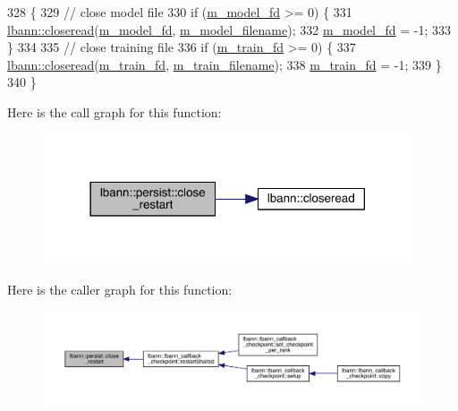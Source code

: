 \begin{DoxyCode}
328                                  \{
329   \textcolor{comment}{// close model file}
330   \textcolor{keywordflow}{if} (\hyperlink{classlbann_1_1persist_a1adc7102c1b4bc91534ca156decbd965}{m\_model\_fd} >= 0) \{
331     \hyperlink{namespacelbann_a38dd30b2ae8214f6595708264369ddb8}{lbann::closeread}(\hyperlink{classlbann_1_1persist_a1adc7102c1b4bc91534ca156decbd965}{m\_model\_fd}, \hyperlink{classlbann_1_1persist_ac01cd3c8fe0f97c1312ca1a595f2f690}{m\_model\_filename});
332     \hyperlink{classlbann_1_1persist_a1adc7102c1b4bc91534ca156decbd965}{m\_model\_fd} = -1;
333   \}
334 
335   \textcolor{comment}{// close training file}
336   \textcolor{keywordflow}{if} (\hyperlink{classlbann_1_1persist_a817671390811dde04670c47139402f51}{m\_train\_fd} >= 0) \{
337     \hyperlink{namespacelbann_a38dd30b2ae8214f6595708264369ddb8}{lbann::closeread}(\hyperlink{classlbann_1_1persist_a817671390811dde04670c47139402f51}{m\_train\_fd}, \hyperlink{classlbann_1_1persist_a417a443c894fd07472504936f5b02b62}{m\_train\_filename});
338     \hyperlink{classlbann_1_1persist_a817671390811dde04670c47139402f51}{m\_train\_fd} = -1;
339   \}
340 \}
\end{DoxyCode}
Here is the call graph for this function\+:\nopagebreak
\begin{figure}[H]
\begin{center}
\leavevmode
\includegraphics[width=310pt]{classlbann_1_1persist_afeef05548e1d17bd09d3805607edd621_cgraph}
\end{center}
\end{figure}
Here is the caller graph for this function\+:\nopagebreak
\begin{figure}[H]
\begin{center}
\leavevmode
\includegraphics[width=350pt]{classlbann_1_1persist_afeef05548e1d17bd09d3805607edd621_icgraph}
\end{center}
\end{figure}
\mbox{\label{classlbann_1_1persist_ad759657d69e88a491729ce8e4bf9510e}} 
